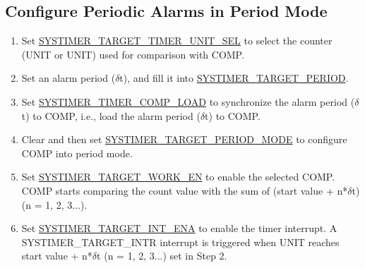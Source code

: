 \documentclass[main\_\_EN.tex]{subfiles}
\begin{document}
\subsection{Configure Periodic Alarms in Period Mode}
\begin{enumerate}
    \item Set \hyperref[fielddesc:SYSTIMERTARGET0TIMERUNITSEL]{SYSTIMER\_TARGET\_TIMER\_UNIT\_SEL} to select the counter (UNIT or UNIT) used for comparison with COMP.
    \item Set an alarm period ($\delta$t), and fill it into \hyperref[fielddesc:SYSTIMERTARGET0PERIOD]{SYSTIMER\_TARGET\_PERIOD}.
    \item Set \hyperref[fielddesc:SYSTIMERTIMERCOMP0LOAD]{SYSTIMER\_TIMER\_COMP\_LOAD} to synchronize the alarm period ($\delta$t) to COMP, i.e., load the alarm period ($\delta$t) to COMP.
    \item Clear and then set \hyperref[fielddesc:SYSTIMERTARGET0PERIODMODE]{SYSTIMER\_TARGET\_PERIOD\_MODE} to configure COMP into period mode.
    \item Set \hyperref[fielddesc:SYSTIMERTARGET0WORKEN]{SYSTIMER\_TARGET\_WORK\_EN} to enable the selected COMP. COMP starts comparing the count value with the sum of (start value + n*$\delta$t) (n = 1, 2, 3...).
    \item Set \hyperref[fielddesc:SYSTIMERTARGET0INTENA]{SYSTIMER\_TARGET\_INT\_ENA} to enable the timer interrupt. A SYSTIMER\_TARGET\_INTR interrupt is triggered when UNIT reaches start value + n*$\delta$t (n = 1, 2, 3...) set in Step 2.
\end{enumerate}
\end{document}
